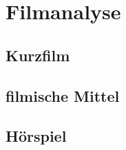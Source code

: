 
\section{Filmanalyse}


\subsection{Kurzfilm}


\subsection{filmische Mittel}


\subsection{Hörspiel}


